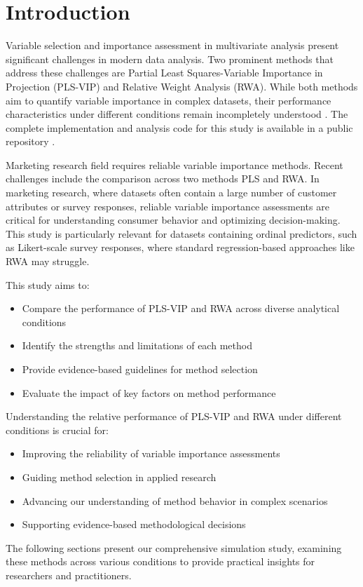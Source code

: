\section{Introduction}

Variable selection and importance assessment in multivariate analysis present significant challenges in modern data analysis. Two prominent methods that address these challenges are Partial Least Squares-Variable Importance in Projection (PLS-VIP) \citep{wold2001pls} and Relative Weight Analysis (RWA). While both methods aim to quantify variable importance in complex datasets, their performance characteristics under different conditions remain incompletely understood \citep{chong2005performance, tonidandel2011relative}. The complete implementation and analysis code for this study is available in a public repository \citep{marinucci2024pls}.

Marketing research field requires reliable variable importance methods. Recent challenges include the comparison across two methods PLS and RWA. In marketing research, where datasets often contain a large number of customer attributes or survey responses, reliable variable importance assessments are critical for understanding consumer behavior and optimizing decision-making. This study is particularly relevant for datasets containing ordinal predictors, such as Likert-scale survey responses, where standard regression-based approaches like RWA may struggle.

This study aims to:
\begin{itemize}
    \item Compare the performance of PLS-VIP and RWA across diverse analytical conditions
    \item Identify the strengths and limitations of each method
    \item Provide evidence-based guidelines for method selection
    \item Evaluate the impact of key factors on method performance
\end{itemize}

Understanding the relative performance of PLS-VIP and RWA under different conditions is crucial for:
\begin{itemize}
    \item Improving the reliability of variable importance assessments
    \item Guiding method selection in applied research
    \item Advancing our understanding of method behavior in complex scenarios
    \item Supporting evidence-based methodological decisions
\end{itemize}

The following sections present our comprehensive simulation study, examining these methods across various conditions to provide practical insights for researchers and practitioners. 